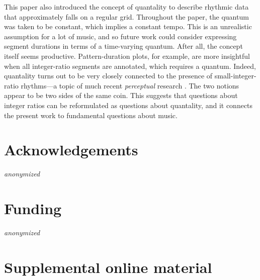 \documentclass{tMAM2e}%
\theoremstyle{plain}
\theoremstyle{definition}
\theoremstyle{remark}
\newcommand{\anonymized}{{\color{red}\emph{anonymized}}}
\begin{document}
This paper also introduced the concept of quantality to describe rhythmic data that approximately falls on a regular grid. 
Throughout the paper, the quantum was taken to be constant, which implies a constant tempo. 
This is an unrealistic assumption for a lot of music, and so future work could consider expressing segment durations in terms of a time-varying quantum. 
After all, the concept itself seems productive. 
Pattern-duration plots, for example, are more insightful when all integer-ratio segments are annotated, which requires a quantum. 
Indeed, quantality turns out to be very closely connected to the presence of small-integer-ratio rhythms—a topic of much recent \emph{perceptual} research \citep{Jacoby2024NatHumBehav,Jacoby2017CurrBiol,Ravignani2018FrontComputNeurosci}.
The two notions appear to be two sides of the same coin. 
This suggests that questions about integer ratios can be reformulated as questions about quantality, and it connects the present work to fundamental questions about music.




\section*{Acknowledgements}

\anonymized{}



\section*{Funding}

\anonymized{}



\section*{Supplemental online material}
\end{document}
